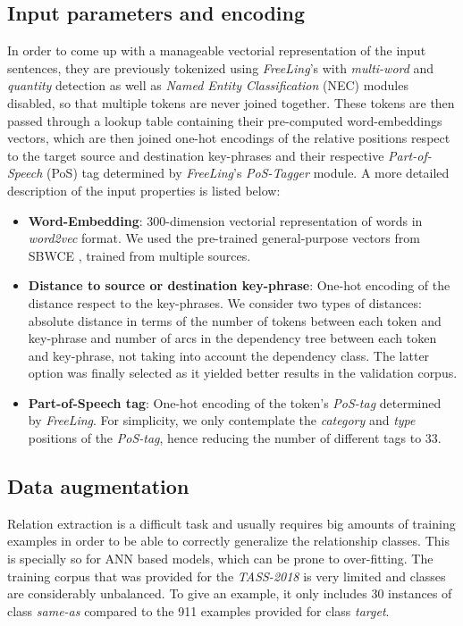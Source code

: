 \documentclass[a4paper,11pt,twocolumn,twoside]{article}
\begin{document}
\subsection{Input parameters and encoding}

In order to come up with a manageable vectorial representation of the input sentences, they are
previously tokenized using \emph{FreeLing}'s with \emph{multi-word} and
\emph{quantity} detection as well as \emph{Named Entity Classification} (NEC)
modules disabled, so that multiple tokens are never joined together. These tokens are then
passed through a lookup table containing their pre-computed word-embeddings vectors, which are
then joined one-hot encodings of the relative positions respect to the target source
and destination key-phrases and their respective \emph{Part-of-Speech} (PoS) tag determined by
\emph{FreeLing}'s \emph{PoS-Tagger} module. A more detailed description of the input properties is listed below:

\begin{itemize}
\item \textbf{Word-Embedding}: 300-dimension vectorial representation of words in \emph{word2vec} format. We used the pre-trained general-purpose vectors from SBWCE \cite{cardellinoSBWCE}, trained from multiple sources.
\item \textbf{Distance to source or destination key-phrase}: One-hot encoding of the distance respect to the key-phrases. We consider two types of distances: absolute distance in terms of the number of tokens between each token and key-phrase and number of arcs in the dependency tree between each token and key-phrase, not taking into account the dependency class. The latter option was finally selected as it yielded better results in the validation corpus.
\item \textbf{Part-of-Speech tag}: One-hot encoding of the token's \emph{PoS-tag} determined by \emph{FreeLing}. For simplicity, we only contemplate the \emph{category} and \emph{type} positions of the \emph{PoS-tag}, hence reducing the number of different tags to 33.
\end{itemize}

\subsection{Data augmentation}

Relation extraction is a difficult task and usually requires big amounts of training examples in order to be able to correctly generalize the relationship classes. This is specially so for ANN based models, which can be prone to over-fitting. The training corpus that was provided for the \emph{TASS-2018} is very limited and classes are considerably unbalanced. To give an example, it only includes 30 instances of class \emph{same-as} compared to the 911 examples provided for class \emph{target}.
\end{document}
